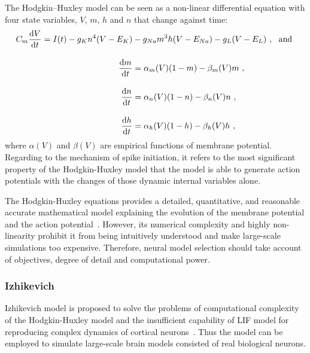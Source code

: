The Hodgkin–Huxley model can be seen as a non-linear differential equation with four state variables, $V$, $m$, $h$ and $n$ that change against time:
\begin{equation}
\begin{aligned}
C_m \dfrac{\mathrm{d} V}{\mathrm{d} t} = I(t) - g_{K}n^4(V-E_{K}) &- g_{Na}m^3h(V-E_{Na}) - g_L(V-E_L)~, \textrm{~~and }\\[10pt]
\dfrac{\mathrm{d} m}{\mathrm{d} t} &= \alpha_m(V)(1-m) - \beta_m(V)m~, \\[10pt]
\dfrac{\mathrm{d} n}{\mathrm{d} t} &= \alpha_n(V)(1-n) - \beta_n(V)n~, \\[10pt]
\dfrac{\mathrm{d} h}{\mathrm{d} t} &= \alpha_h(V)(1-h) - \beta_h(V)h~,
\end{aligned}
\end{equation} 
where $\alpha(V)$ and  $\beta(V)$ are empirical functions of membrane potential.
Regarding to the mechanism of spike initiation, it refers to the most significant property of the Hodgkin-Huxley model that the model is able to generate action potentials with the changes of those dynamic internal variables alone.

The Hodgkin-Huxley equations provides a detailed, quantitative, and reasonable accurate mathematical model explaining the evolution of the membrane potential and the action potential~\cite{byrne2014molecules}.
However, its numerical complexity and highly non-linearity prohibit it from being intuitively understood and make large-scale simulations too expensive.
Therefore, neural model selection should take account of objectives, degree of detail and computational power.

\subsubsection{Izhikevich}
Izhikevich model is proposed to solve the problems of computational complexity of the Hodgkin-Huxley model and the insufficient capability of LIF model for reproducing complex dynamics of cortical neurons~\cite{izhikevich2003simple}.
Thus the model can be employed to simulate large-scale brain models consisted of real biological neurons.

